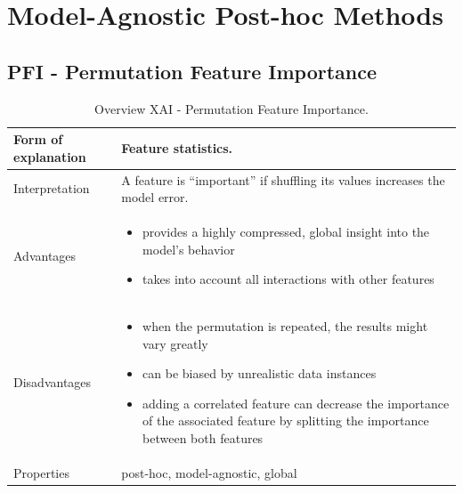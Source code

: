 
\newpage
\section{Model-Agnostic Post-hoc Methods}\label{sec:4}

\subsection{PFI - Permutation Feature Importance}

\begin{table}[H]
  \centering
  \begin{tabular}{|p{}|p{}|}
    \hline
    Form of \newline explanation & 
    Feature statistics. \\
    
    \hline
    Interpretation & 
    A feature is “important” if shuffling its values increases the model error. \\
    \hline
    Advantages &
    \begin{itemize}[nosep, left=0em]
        \item provides a highly compressed, global insight into the model’s behavior
        \item takes into account all interactions with other features
    \end{itemize} \\
    
    \hline
    Disadvantages &
    \begin{itemize}[nosep, left=0em]
        \item when the permutation is repeated, the results might vary greatly
        \item can be biased by unrealistic data instances
        \item adding a correlated feature can decrease the importance of the associated feature by splitting the importance between both features
    \end{itemize} \\
    
    \hline
    Properties & 
    post-hoc, model-agnostic, global  \\
    
    \hline
  \end{tabular}
  \caption{Overview XAI - Permutation Feature Importance.}
  \label{tab:XAIPFI}
\end{table}

